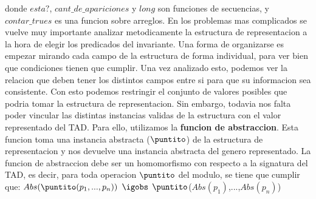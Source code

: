 \documentclass[10pt,a4paper]{article}
\begin{document}
\medskip
\medskip
\medskip
donde $esta?$, $cant\_de\_apariciones$ y $long$ son funciones de secuencias, y $contar\_trues$ es una funcion sobre arreglos. En los problemas mas complicados se vuelve muy importante analizar metodicamente la estructura de representacion a la hora de elegir los predicados del invariante. Una forma de organizarse es empezar mirando cada campo de la estructura de forma individual, para ver bien que condiciones tienen que cumplir. Una vez analizado esto, podemos ver la relacion que deben tener los distintos campos entre
si para que su informacion sea consistente.
\newline
\newline
Con esto podemos restringir el conjunto de valores posibles que podria tomar la estructura de representacion. Sin embargo, todavia nos falta poder vincular las distintas instancias validas de la estructura con el valor representado del TAD. Para ello, utilizamos la \textbf{funcion de abstraccion}. Esta funcion toma una instancia abstracta ($\puntito$) de la estructura de representacion y nos devuelve una instancia abstracta del genero representado. La funcion de abstraccion debe ser un homomorfismo con respecto a la signatura
del TAD, es decir, para toda operacion $\puntito$ del modulo, se tiene que cumplir que:
\newline
\newline
$Abs(\puntito(p_{1},...,p_{n}))$ $\igobs$ $\puntito$($Abs(p_{1})$,...,$Abs(p_{n})$)
\end{document}
